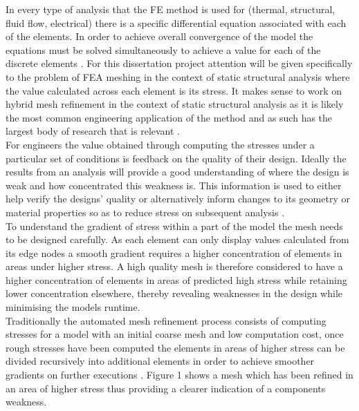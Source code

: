 \documentclass{article}
\begin{document}
\noindent
In every type of analysis that the FE method is used for (thermal, structural, fluid flow, electrical) there is a specific differential equation associated with each of the elements. In order to achieve overall convergence of the model the equations must be solved simultaneously to achieve a value for each of the discrete elements \cite{IntroductionToFE}. For this dissertation project attention will be given specifically to the problem of FEA meshing in the context of static structural analysis where the value calculated across each element is its stress. It makes sense to work on hybrid mesh refinement in the context of static structural analysis as it is likely the most common engineering application of the method and as such has the largest body of research that is relevant \cite{DolsakPaper94}\cite{IntroductionToFE}.\\

\noindent
For engineers the value obtained through computing the stresses under a particular set of conditions is feedback on the quality of their design. Ideally the results from an analysis will provide a good understanding of where the design is weak and how concentrated this weakness is. This information is used to either help verify the designs' quality or alternatively inform changes to its geometry or material properties so as to reduce stress on subsequent analysis \cite{cite06}.\\

\noindent
To understand the gradient of stress within a part of the model the mesh needs to be designed carefully. As each element can only display values calculated from its edge nodes a smooth gradient requires a higher concentration of elements in areas under higher stress. A high quality mesh is therefore considered to have a higher concentration of elements in areas of predicted high stress while retaining lower concentration elsewhere, thereby revealing weaknesses in the design while minimising the models runtime.\\

\noindent
Traditionally the automated mesh refinement process consists of computing stresses for a model with an initial coarse mesh and low computation cost, once rough stresses have been computed the elements in areas of higher stress can be divided recursively into additional elements in order to achieve smoother gradients on further executions \cite{cite03}. Figure 1 shows a mesh which has been refined in an area of higher stress thus providing a clearer indication of a components weakness. \\ 
\end{document}
